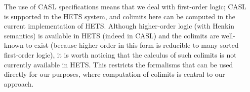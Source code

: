 The use of CASL specifications means that we deal with first-order
logic; CASL is supported in the HETS system, and colimits here can be
computed in the current implementation of HETS. Although higher-order
logic (with Henkin semantics) is available in HETS (indeed in CASL)
and the colimits are well-known to exist (because higher-order in this
form is reducible to many-sorted first-order logic), it is worth
noticing that the calculus of such colimits is not currently available
in HETS.  This restricts the formalisms that can be used directly for
our purposes, where computation of colimits is central to our
approach.


